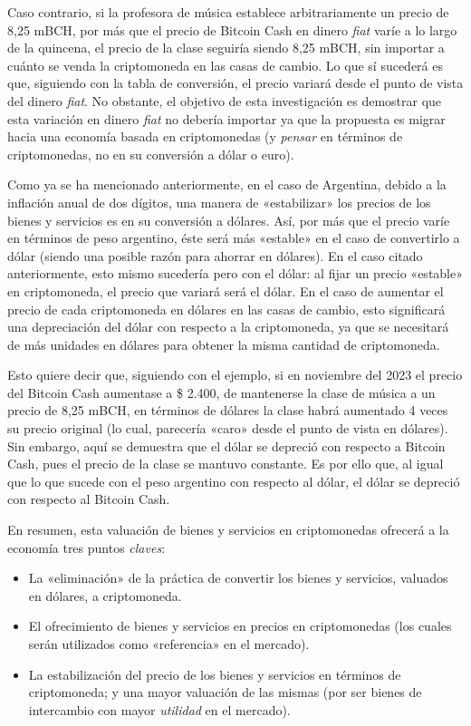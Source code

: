 \documentclass[12pt,a4paper,twoside]{book}
\begin{document}
Caso contrario, si la profesora de música establece arbitrariamente un precio de 8,25 mBCH, por más que el precio de Bitcoin Cash en dinero \textit{fiat} varíe a lo largo de la quincena, el precio de la clase seguiría siendo 8,25 mBCH, sin importar a cuánto se venda la criptomoneda en las casas de cambio. Lo que sí sucederá es que, siguiendo con la tabla de conversión, el precio variará desde el punto de vista del dinero \textit{fiat}. No obstante, el objetivo de esta investigación es demostrar que esta variación en dinero \textit{fiat} no debería importar ya que la propuesta es migrar hacia una economía basada en criptomonedas (y \textit{pensar} en términos de criptomonedas, no en su conversión a dólar o euro).

Como ya se ha mencionado anteriormente, en el caso de Argentina, debido a la inflación anual de dos dígitos, una manera de «estabilizar» los precios de los bienes y servicios es en su conversión a dólares. Así, por más que el precio varíe en términos de peso argentino, éste será más «estable» en el caso de convertirlo a dólar (siendo una posible razón para ahorrar en dólares). En el caso citado anteriormente, esto mismo sucedería pero con el dólar: al fijar un precio «estable» en criptomoneda, el precio que variará será el dólar. En el caso de aumentar el precio de cada criptomoneda en dólares en las casas de cambio, esto significará una depreciación del dólar con respecto a la criptomoneda, ya que se necesitará de más unidades en dólares para obtener la misma cantidad de criptomoneda.

Esto quiere decir que, siguiendo con el ejemplo, si en noviembre del 2023 el precio del Bitcoin Cash aumentase a \$ 2.400, de mantenerse la clase de música a un precio de 8,25 mBCH, en términos de dólares la clase habrá aumentado 4 veces su precio original (lo cual, parecería «caro» desde el punto de vista en dólares). Sin embargo, aquí se demuestra que el dólar se depreció con respecto a Bitcoin Cash, pues el precio de la clase se mantuvo constante. Es por ello que, al igual que lo que sucede con el peso argentino con respecto al dólar, el dólar se depreció con respecto al Bitcoin Cash.

En resumen, esta valuación de bienes y servicios en criptomonedas ofrecerá a la economía tres puntos \textit{claves}:

\begin{itemize}
\item La «eliminación» de la práctica de convertir los bienes y servicios, valuados en dólares, a criptomoneda.
\item El ofrecimiento de bienes y servicios en precios en criptomonedas (los cuales serán utilizados como «referencia» en el mercado).
\item La estabilización del precio de los bienes y servicios en términos de criptomoneda; y una mayor valuación de las mismas (por ser bienes de intercambio con mayor \textit{utilidad} en el mercado).
\end{itemize}
\end{document}
